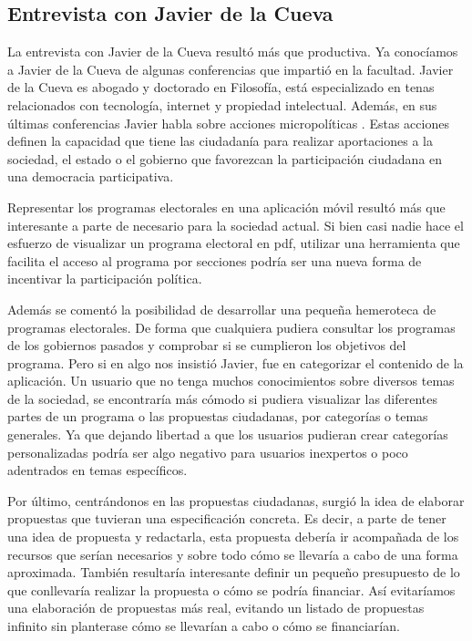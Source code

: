 \subsection{Entrevista con Javier de la Cueva}

La entrevista con Javier de la Cueva resultó más que productiva. Ya conocíamos a Javier de la Cueva de algunas conferencias que impartió en la facultad. Javier de la Cueva es abogado y doctorado en Filosofía, está especializado en tenas relacionados con tecnología, internet y propiedad intelectual. Además, en sus últimas conferencias Javier habla sobre acciones micropolíticas \cite{ref:manualCiberactivista}. Estas acciones definen la capacidad que tiene las ciudadanía para realizar aportaciones a la sociedad, el estado o el gobierno que favorezcan la participación ciudadana en una democracia participativa.

Representar los programas electorales en una aplicación móvil resultó más que interesante a parte de necesario para la sociedad actual. Si bien casi nadie hace el esfuerzo de visualizar un programa electoral en pdf, utilizar una herramienta que facilita el acceso al programa por secciones podría ser una nueva forma de incentivar la participación política. 

Además se comentó la posibilidad de desarrollar una pequeña hemeroteca de programas electorales. De forma que cualquiera pudiera consultar los programas de los gobiernos pasados y comprobar si se cumplieron los objetivos del programa. Pero si en algo nos insistió Javier, fue en categorizar el contenido de la aplicación. Un usuario que no tenga muchos conocimientos sobre diversos temas de la sociedad, se encontraría más cómodo si pudiera visualizar las diferentes partes de un programa o las propuestas ciudadanas, por categorías o temas generales. Ya que dejando libertad a que los usuarios pudieran crear categorías personalizadas podría ser algo negativo para usuarios inexpertos o poco adentrados en temas específicos.

Por último, centrándonos en las propuestas ciudadanas, surgió la idea de elaborar propuestas que tuvieran una especificación concreta. Es decir, a parte de tener una idea de propuesta y redactarla, esta propuesta debería ir acompañada de los recursos que serían necesarios y sobre todo cómo se llevaría a cabo de una forma aproximada. También resultaría interesante definir un pequeño presupuesto de lo que conllevaría realizar la propuesta o cómo se podría financiar. Así evitaríamos una elaboración de propuestas más real, evitando un listado de propuestas infinito sin planterase cómo se llevarían a cabo o cómo se financiarían.

